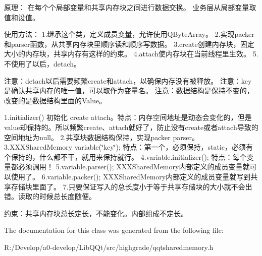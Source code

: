 原理： 在每个个局部变量和共享内存块之间进行数据交换。 业务层从局部变量取值和设值。

使用方法： 1.继承这个类，定义成员变量，允许使用\+Q\+Byte\+Array。 2.实现packer和parser函数，从共享内存块里顺序读和顺序写数据。 3.\+create创建内存块，固定大小的内存块，共享内存有这样的约束。 4.\+attach使内存块在当前线程里生效。 5.不使用了以后，detach。

注意：detach以后需要频繁create和attach，以确保内存没有被释放。 注意：key是确认共享内存的唯一值，可以取作为变量名。 注意：数据结构是保持不变的，改变的是数据结构里面的\+Value。

1.\+initializer() 初始化 create attach。特点：内存空间地址是动态会变化的，但是value却保持的。所以频繁create、attach就好了，防止没有create或者attach导致的空间地址为null。 2.共享块数据结构保持，实现packer parser。 3.\+X\+X\+X\+Shared\+Memory variable(\char`\"{}key\char`\"{}); 特点：第一个，必须保持，static，必须有个保持的，什么都不干，就用来保持就行。 4.\+variable.\+initializer(); 特点：每个变量都必须调用！ 5.\+variable.\+parser(); X\+X\+X\+Shared\+Memory内部定义的成员变量就可以使用了。 6.\+variable.\+packer(); X\+X\+X\+Shared\+Memory内部定义的成员变量就写到共享存储块里面了。 7.只要保证写入的总长度小于等于共享存储块的大小就不会出错。读取的时候总长度随便。

约束：共享内存块总长定长，不能变化。内部组成不定长。 

The documentation for this class was generated from the following file\+:\begin{DoxyCompactItemize}
\item 
R\+:/\+Develop/a0-\/develop/\+Lib\+Q\+Qt/src/highgrade/qqtsharedmemory.\+h\end{DoxyCompactItemize}

